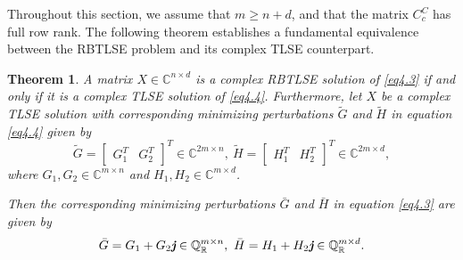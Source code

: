 \documentclass[preprint,11pt,3p]{elsarticle}
\newtheorem{theorem}{Theorem}[section]
\def \C{{\mathbb C}}
\def \QR{\mathbb{Q}_\mathbb{R}}
\def \j{\textit{\textbf{j}}}
\begin{document}
Throughout this section, we assume that $m \geq n + d$, and that the matrix $C^C_c$ has full row rank. The following theorem establishes a fundamental equivalence between the RBTLSE problem and its complex TLSE counterpart.
\begin{theorem}\label{thm4.1}
	A matrix $X \in \C^{n \times d}$ is a complex RBTLSE solution of \eqref{eq4.3} if and only if it is a complex TLSE solution of \eqref{eq4.4}. Furthermore, let $X$ be a complex TLSE solution with corresponding minimizing perturbations $\widetilde{G}$ and $\widetilde{H}$ in equation \eqref{eq4.4} given by
	\begin{equation*}
		\widetilde{G} = \begin{bmatrix} G_1^T & G_2^T \end{bmatrix}^T \in \C^{2m \times n}, ~
		\widetilde{H} = \begin{bmatrix} H_1^T & H_2^T \end{bmatrix}^T \in \C^{2m \times d},
	\end{equation*}
	where $G_1, G_2 \in \C^{m \times n}$ and $H_1, H_2 \in \C^{m \times d}$.
	
	 Then the corresponding minimizing perturbations $\bar{G}$ and $\bar{H}$ in equation \eqref{eq4.3} are given by
	\begin{equation*}
		\bar{G} = G_1 + G_2\j \in \QR^{m \times n}, ~
		\bar{H} = H_1 + H_2\j \in \QR^{m \times d}.
	\end{equation*}
	\end{theorem}
\end{document}
